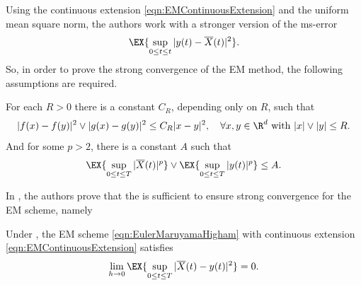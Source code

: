 	Using the continuous extension \eqref{eqn:EMContinuousExtension} %
and the uniform mean square norm, the authors work with a stronger version of the ms-error%
$$
	\EX{\sup_{0\leq t \leq t}|y(t)-\overline{X}(t)|^2}.
$$
%
So, in  order to prove the strong convergence of the EM method, the following assumptions are required.
\begin{assumption}\label{ass:HighamAssumption}
	For each $R>0$ there is a constant $C_R$, depending only on $R$, such that
	\begin{equation}\label{ass:LipschitzCondition}
		|f(x)-f(y)|^2 \vee |g(x)-g(y)|^2 \leq C_R|x-y|^2,
		\quad
		\forall x,y\in \R^d 
		\text{ with } |x|\vee |y|\leq R.
	\end{equation}
	And for some $p>2$, there is a constant $A$ such that
	\begin{equation}
		\EX{\sup_{0\leq t\leq T}|\overline{X}(t)|^p}
		\vee
		\EX{\sup_{0\leq t\leq T}|y(t)|^p} \leq A.
	\end{equation}
\end{assumption}
In \cite{Higham2002b}, the authors prove that the  is sufficient to ensure strong 
convergence for the EM scheme, namely 
\begin{thm}\label{thm:HighamMaoStuart}
	Under , the EM scheme \eqref{eqn:EulerMaruyamaHigham} with continuous extension
	\eqref{eqn:EMContinuousExtension}
	satisfies
	\begin{equation}
		\lim_{h\to 0}
		\EX{\sup_{0\leq t\leq T}|\overline{X}(t)-y(t)|^2}=0.
	\end{equation}
\end{thm}
	

